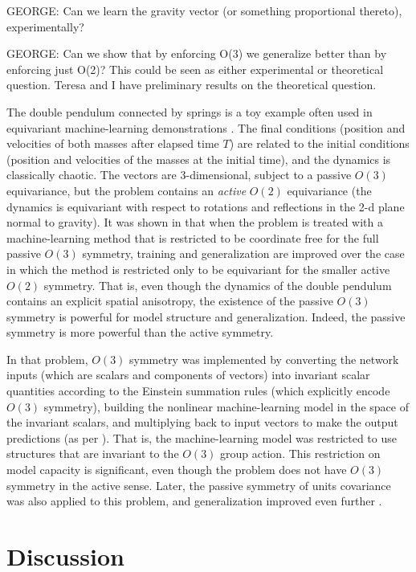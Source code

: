 \documentclass[11pt]{article}
\begin{document}
GEORGE: Can we learn the gravity vector (or something proportional thereto), experimentally?

GEORGE: Can we show that by enforcing O(3) we generalize better than by enforcing just O(2)? This could be seen as either experimental or theoretical question. Teresa and I have preliminary results on the theoretical question.

The double pendulum connected by springs is a toy example often used in equivariant machine-learning demonstrations \cite{finzi2021practical,yao2021simple}. 
The final conditions (position and velocities of both masses after elapsed time $T$) are related to the initial conditions (position and velocities of the masses at the initial time), and the dynamics is classically chaotic.
The vectors are 3-dimensional, subject to a passive $O(3)$ equivariance, but the problem contains an \emph{active} $O(2)$ equivariance (the dynamics is equivariant with respect to rotations and reflections in the 2-d plane normal to gravity).
It was shown in \cite{yao2021simple} that when the problem is treated with a machine-learning method that is restricted to be coordinate free for the full passive $O(3)$ symmetry, training and generalization are improved over the case in which the method is restricted only to be equivariant for the smaller active $O(2)$ symmetry.
That is, even though the dynamics of the double pendulum contains an explicit spatial anisotropy, the existence of the passive $O(3)$ symmetry is powerful for model structure and generalization.
Indeed, the passive symmetry is more powerful than the active symmetry.

In that problem, $O(3)$ symmetry was implemented by converting the network inputs (which are scalars and components of vectors) into invariant scalar quantities according to the Einstein summation rules (which explicitly encode $O(3)$ symmetry), building the nonlinear machine-learning model in the space of the invariant scalars, and multiplying back to input vectors to make the output predictions (as per \cite{villar2021scalars}).
That is, the machine-learning model was restricted to use structures that are invariant to the $O(3)$ group action.
This restriction on model capacity is significant, even though the problem does not have $O(3)$ symmetry in the active sense.
Later, the passive symmetry of units covariance was also applied to this problem, and generalization improved even further \cite{villar2022dimensionless}.

\section*{Discussion}
\end{document}
